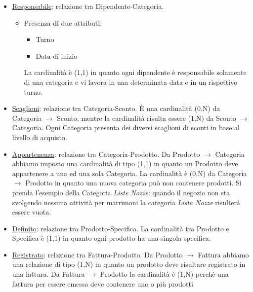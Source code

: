 \begin{itemize}

\item \underline{Responsabile}: relazione tra Dipendente-Categoria.
  \begin{itemize}
  \item Presenza di due attributi:
  \begin{itemize}
  \item Turno
  \item Data di inizio
  \end{itemize}
  La cardinalit\`a \`e (1,1) in quanto ogni dipendente \`e responsabile solamente di una categoria e vi lavora in una determinata data e in un rispettivo turno.

  \end{itemize}

\item \underline{Scaglioni}: relazione tra Categoria-Sconto. \`E una cardinalit\`a (0,N) da Categoria $\to$ Sconto, mentre la cardinalit\`a risulta essere (1,N) da Sconto $\to$ Categoria. \newline
Ogni Categoria presenta dei diversi scaglioni di sconti in base al livello di acquisto.

\item \underline{Appartenenza}: relazione tra Categoria-Prodotto. Da Prodotto $\to$ Categoria abbiamo imposto una cardinalit\`a di tipo (1,1) in quanto un Prodotto deve appartenere a una ed una sola Categoria. \newline
  La cardinalit\`a \`e (0,N) da Categoria $\to$ Prodotto in quanto una nuova categoria pu\`o non contenere prodotti.\newline
  Si prenda l'esempio della Categoria \textit{Liste Nozze}: quando il negozio non sta svolgendo nessuna attivit\`a per matrimoni la categoria \textit{Lista Nozze} risulter\`a essere vuota. %

\item \underline{Definito}: relazione tra Prodotto-Specifica. La cardinalit\`a tra Prodotto e Specifica \`e (1,1) in quanto ogni prodotto ha una singola specifica.

\item \underline{Registrato}: relazione tra Fattura-Prodotto. Da Prodotto $\to$ Fattura abbiamo una relazione di tipo (1,N) in quanto un prodotto deve risultare registrato in una fattura. \newline
  Da Fattura $\to$ Prodotto la cardinalit\`a \`e (1,N) perch\`e una fattura per essere emessa deve contenere uno o pi\`u prodotti


\end{itemize}
